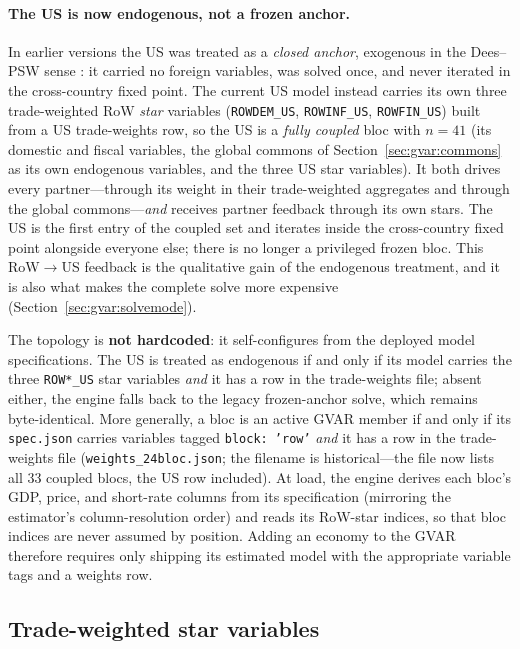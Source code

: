 \documentclass[11pt]{article}
\theoremstyle{definition}
\theoremstyle{remark}
\begin{document}
\paragraph{The US is now endogenous, not a frozen anchor.} In earlier versions
the US was treated as a \emph{closed anchor}, exogenous in the Dees--PSW sense
\citep{DeesDiMauroPesaranSmith2007}: it carried no foreign variables, was solved
once, and never iterated in the cross-country fixed point. The current US model
instead carries its own three trade-weighted RoW \emph{star} variables
(\texttt{ROWDEM\_US}, \texttt{ROWINF\_US}, \texttt{ROWFIN\_US}) built from a US
trade-weights row, so the US is a \emph{fully coupled} bloc with $n=41$
(its domestic and fiscal variables, the global commons of
Section~\ref{sec:gvar:commons} as its own endogenous variables, and the three
US star variables). It both drives every partner---through its weight in their
trade-weighted aggregates and through the global commons---\emph{and} receives
partner feedback through its own stars. The US is the first entry of the coupled
set and iterates inside the cross-country fixed point alongside everyone else;
there is no longer a privileged frozen bloc. This RoW$\to$US feedback is the
qualitative gain of the endogenous treatment, and it is also what makes the
complete solve more expensive (Section~\ref{sec:gvar:solvemode}).

The topology is \textbf{not hardcoded}: it self-configures from the deployed
model specifications. The US is treated as endogenous if and only if its model
carries the three \texttt{ROW*\_US} star variables \emph{and} it has a row in
the trade-weights file; absent either, the engine falls back to the legacy
frozen-anchor solve, which remains byte-identical. More generally, a bloc is an
active GVAR member if and only if its \texttt{spec.json} carries variables tagged
\texttt{block:\,'row'} \emph{and} it has a row in the trade-weights file
(\texttt{weights\_24bloc.json}; the filename is historical---the file now lists
all $33$ coupled blocs, the US row included). At load, the engine derives each
bloc's GDP, price, and short-rate columns from its specification (mirroring the
estimator's column-resolution order) and reads its RoW-star indices, so that
bloc indices are never assumed by position. Adding an economy to the GVAR
therefore requires only shipping its estimated model with the appropriate
variable tags and a weights row.

\subsection{Trade-weighted star variables}\label{sec:gvar:stars}
\end{document}
